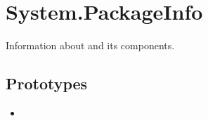 
\section{System.PackageInfo}
Information about \usdk and its components.

\subsection{Prototypes}
\begin{itemize}
\item {}
\end{itemize}

